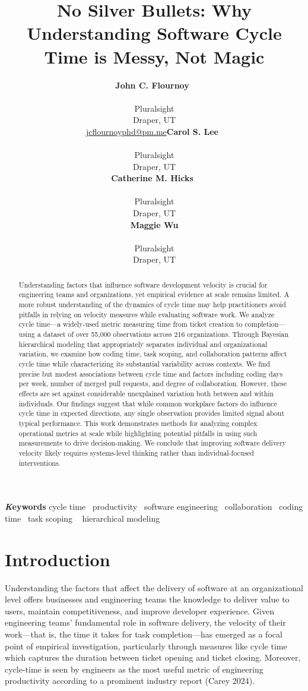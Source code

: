 \documentclass[
]{article}
\title{No Silver Bullets: Why Understanding Software Cycle Time is
Messy, Not Magic}
\author{\textbf{John C.
Flournoy}~\orcidlink{0000-0003-1735-1221}\\\\Pluralsight\\Draper,
UT\\\href{mailto:jcflournoyphd@pm.me}{jcflournoyphd@pm.me}\asep\textbf{Carol
S. Lee}~\orcidlink{0000-0002-6909-6157}\\\\Pluralsight\\Draper,
UT\\\asep\textbf{Catherine M.
Hicks}~\orcidlink{0009-0007-5657-1661}\\\\Pluralsight\\Draper,
UT\\\asep\textbf{Maggie Wu}\\\\Pluralsight\\Draper, UT\\}
\date{}
\begin{document}
\maketitle
\begin{abstract}
Understanding factors that influence software development velocity is
crucial for engineering teams and organizations, yet empirical evidence
at scale remains limited. A more robust understanding of the dynamics of
cycle time may help practitioners avoid pitfalls in relying on velocity
measures while evaluating software work. We analyze cycle time---a
widely-used metric measuring time from ticket creation to
completion---using a dataset of over 55,000 observations across 216
organizations. Through Bayesian hierarchical modeling that appropriately
separates individual and organizational variation, we examine how coding
time, task scoping, and collaboration patterns affect cycle time while
characterizing its substantial variability across contexts. We find
precise but modest associations between cycle time and factors including
coding days per week, number of merged pull requests, and degree of
collaboration. However, these effects are set against considerable
unexplained variation both between and within individuals. Our findings
suggest that while common workplace factors do influence cycle time in
expected directions, any single observation provides limited signal
about typical performance. This work demonstrates methods for analyzing
complex operational metrics at scale while highlighting potential
pitfalls in using such measurements to drive decision-making. We
conclude that improving software delivery velocity likely requires
systems-level thinking rather than individual-focused interventions.
\end{abstract}
{\bfseries \emph Keywords}
\def\sep{\textbullet\ }
cycle time \sep productivity \sep software
engineering \sep collaboration \sep coding time \sep task scoping \sep 
hierarchical modeling



\section{Introduction}\label{introduction}

Understanding the factors that affect the delivery of software at an
organizational level offers businesses and engineering teams the
knowledge to deliver value to users, maintain competitiveness, and
improve developer experience. Given engineering teams' fundamental role
in software delivery, the velocity of their work---that is, the time it
takes for task completion---has emerged as a focal point of empirical
investigation, particularly through measures like cycle time which
captures the duration between ticket opening and ticket closing.
Moreover, cycle-time is seen by engineers as the most useful metric of
engineering productivity according to a prominent industry report (Carey
2024).
\end{document}
